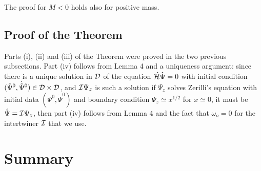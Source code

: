 \documentclass[aps,floats,showpacs,amssymb,tightenlines]{revtex4}
\def\w{\omega}
\def\I{{\cal I}}
\begin{document}
The proof for $M<0$ holds also for positive mass.


\subsection{Proof of the Theorem}

Parts (i), (ii) and (iii) of the Theorem were proved in the two previous subsections. Part (iv) follows from Lemma 4 and a
uniqueness argument: since there is a unique solution in ${\cal D}$ of the equation $\hat {\cal H} \hat \Psi =0$
with initial condition $(\hat \Psi ^0, \dot{\hat{\Psi}}^0) \in {\cal D}  \times {\cal D}$, and $\I \Psi_z$ is such a solution if $\Psi_z$
solves Zerilli's equation with initial data $(\Psi^0, \dot \Psi^0)$ and boundary condition $\Psi_z \simeq x^{1/2}$
for $x \simeq 0$, it must be $\hat \Psi =\I \Psi_z$, then part (iv) follows from Lemma 4 and the fact that $\w_o=0$
for the intertwiner
$\I$ that we use.

 
\section{Summary} \label{sum}
\end{document}
